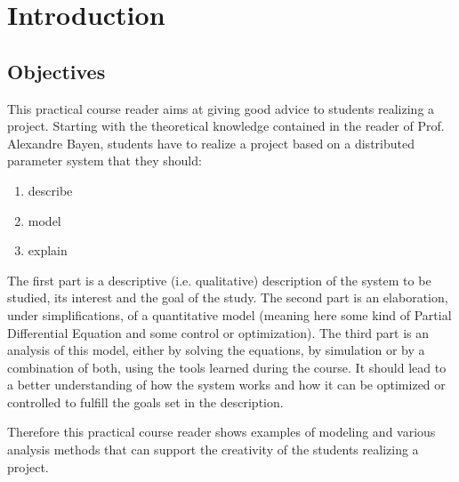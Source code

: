 \thispagestyle{empty}
\chapter{Introduction}
\label{introduction.chap}

\section{Objectives}

This practical course reader aims at giving good advice to students realizing a project. Starting with the theoretical knowledge contained in the reader of Prof. Alexandre Bayen, students have to realize a project based on a distributed parameter system that they should:
\begin{enumerate}
	\item describe
	\item model
	\item explain
\end{enumerate}
The first part is a descriptive (i.e. qualitative) description of the system to be studied, its interest and the goal of the study. The second part is an elaboration, under simplifications, of a quantitative model (meaning here some kind of Partial Differential Equation and some control or optimization). The third part is an analysis of this model, either by solving the equations, by simulation or by a combination of both, using the tools learned during the course. It should lead to a better understanding of how the system works and how it can be optimized or controlled to fulfill the goals set in the description.

Therefore this practical course reader shows examples of modeling and various analysis methods that can support the creativity of the students realizing a project.

